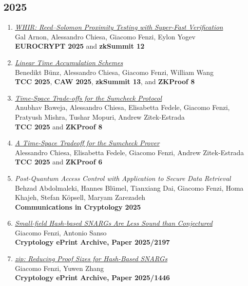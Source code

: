 \documentclass[11pt,a4paper]{article}
\begin{document}
\subsection*{2025}
\begin{enumerate}
  \item \href{https://eprint.iacr.org/2024/1586}{\textit{WHIR: Reed--Solomon Proximity Testing with Super-Fast Verification}}\\
  Gal Arnon, Alessandro Chiesa, Giacomo Fenzi, Eylon Yogev\\
  \textbf{EUROCRYPT 2025} and \textbf{zkSummit 12}

  \item \href{https://eprint.iacr.org/2025/753}{\textit{Linear Time Accumulation Schemes}}\\
  Benedikt Bünz, Alessandro Chiesa, Giacomo Fenzi, William Wang\\
  \textbf{TCC 2025}, \textbf{CAW 2025}, \textbf{zkSummit 13}, and \textbf{ZKProof 8}

  \item \href{https://eprint.iacr.org/2025/1473}{\textit{Time-Space Trade-offs for the Sumcheck Protocol}}\\
  Anubhav Baweja, Alessandro Chiesa, Elisabetta Fedele, Giacomo Fenzi, Pratyush Mishra, Tushar Mopuri, Andrew Zitek-Estrada\\
  \textbf{TCC 2025} and \textbf{ZKProof 8}

  \item \href{https://eprint.iacr.org/2024/524}{\textit{A Time-Space Tradeoff for the Sumcheck Prover}}\\
  Alessandro Chiesa, Elisabetta Fedele, Giacomo Fenzi, Andrew Zitek-Estrada\\
  \textbf{TCC 2025} and \textbf{ZKProof 6}

  \item \textit{Post-Quantum Access Control with Application to Secure Data Retrieval}\\
  Behzad Abdolmaleki, Hannes Blümel, Tianxiang Dai, Giacomo Fenzi, Homa Khajeh, Stefan Köpsell, Maryam Zarezadeh\\
  \textbf{Communications in Cryptology 2025}

  \item \href{https://eprint.iacr.org/2025/2197}{\textit{Small-field Hash-based SNARGs Are Less Sound than Conjectured}}\\
  Giacomo Fenzi, Antonio Sanso\\
  \textbf{Cryptology ePrint Archive, Paper 2025/2197}

  \item \href{https://eprint.iacr.org/2025/1446}{\textit{zip: Reducing Proof Sizes for Hash-Based SNARGs}}\\
  Giacomo Fenzi, Yuwen Zhang\\
  \textbf{Cryptology ePrint Archive, Paper 2025/1446}
\end{enumerate}
\end{document}
